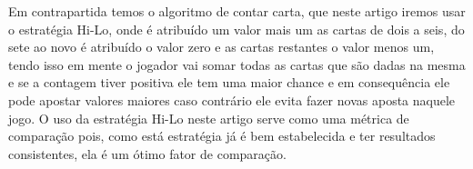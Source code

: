    Em contrapartida temos o algoritmo de contar carta, que neste artigo iremos usar o estratégia Hi-Lo, onde é 
    atribuído um valor mais um as cartas de dois a seis, do sete ao novo é atribuído o valor zero e as cartas restantes 
    o valor menos um, tendo isso em mente o jogador vai somar todas as cartas que são dadas na mesma e se a contagem tiver 
    positiva ele tem uma maior chance e em consequência ele pode apostar valores maiores caso contrário ele evita fazer novas 
    aposta naquele jogo. O uso da estratégia Hi-Lo neste artigo serve como uma métrica de comparação pois, como está estratégia 
    já é bem estabelecida e ter resultados consistentes, ela é um ótimo fator de comparação. \cite{hi-lo-system} \cite{hi-lo-counting-card}

    